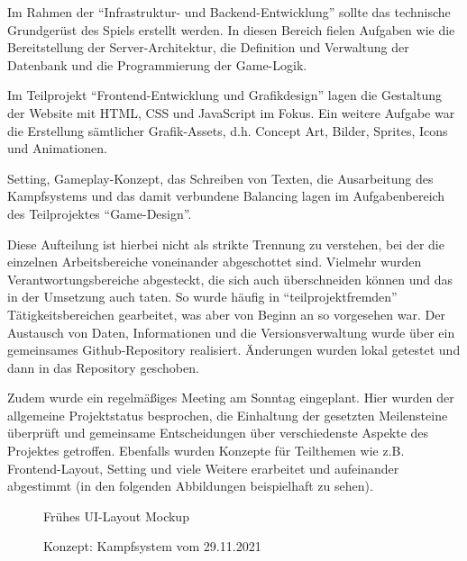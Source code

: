 Im Rahmen der \enquote{Infrastruktur- und Backend-Entwicklung} sollte das technische Grundgerüst des Spiels erstellt werden. In diesen Bereich fielen Aufgaben wie die Bereitstellung der Server-Architektur, die Definition und Verwaltung der Datenbank und die Programmierung der Game-Logik.

Im Teilprojekt \enquote{Frontend-Entwicklung und Grafikdesign} lagen die Gestaltung der Website mit HTML, CSS und JavaScript im Fokus. Ein weitere Aufgabe war die Erstellung sämtlicher Grafik-Assets, d.h. Concept Art, Bilder, Sprites, Icons und Animationen.

Setting, Gameplay-Konzept, das Schreiben von Texten, die Ausarbeitung des Kampfsystems und das damit verbundene Balancing lagen im Aufgabenbereich des Teilprojektes \enquote{Game-Design}.

Diese Aufteilung ist hierbei nicht als strikte Trennung zu verstehen, bei der die einzelnen Arbeitsbereiche voneinander abgeschottet sind. Vielmehr wurden Verantwortungsbereiche abgesteckt, die sich auch überschneiden können und das in der Umsetzung auch taten. So wurde häufig in \enquote{teilprojektfremden} Tätigkeitsbereichen gearbeitet, was aber von Beginn an so vorgesehen war. Der Austausch von Daten, Informationen und die Versionsverwaltung wurde über ein gemeinsames Github-Repository realisiert. Änderungen wurden lokal getestet und dann in das Repository geschoben. 

Zudem wurde ein regelmäßiges Meeting am Sonntag eingeplant. Hier wurden der allgemeine Projektstatus besprochen, die Einhaltung der gesetzten Meilensteine überprüft und gemeinsame Entscheidungen über verschiedenste Aspekte des Projektes getroffen.
Ebenfalls wurden Konzepte für Teilthemen wie z.B. Frontend-Layout, Setting und viele Weitere erarbeitet und aufeinander abgestimmt (in den folgenden Abbildungen beispielhaft zu sehen).

\begin{figure}[H]
    \centering
    \caption{Frühes UI-Layout Mockup}
    \label{fig:2021-12-05-Projketbesprechung-Miro-d}
\end{figure}


\begin{figure}[H]
    \centering
    \caption{Konzept: Kampfsystem vom 29.11.2021}
    \label{fig:2021-11-29-konzept_kampfsystem}
\end{figure}





